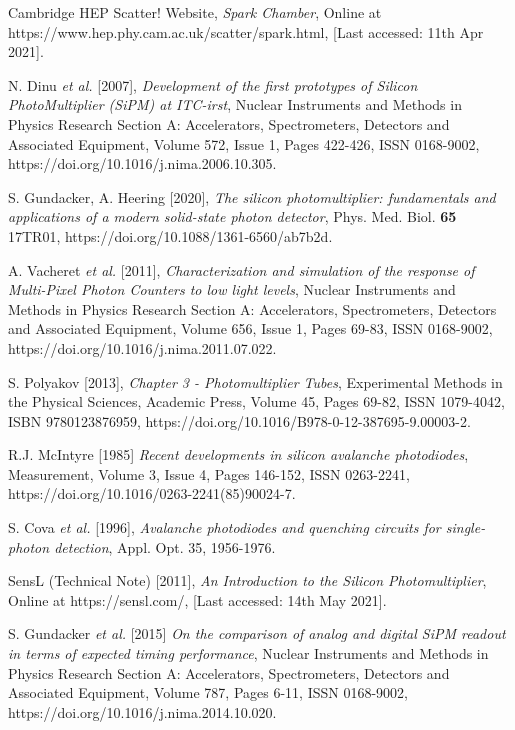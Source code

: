 \begin{thebibliography}{9}

Cambridge HEP Scatter! Website,
\textit{Spark Chamber},
Online at https://www.hep.phy.cam.ac.uk/scatter/spark.html,
[Last accessed: 11th Apr 2021].

N. Dinu \textit{et al.} [2007],
\textit{Development of the first prototypes of Silicon PhotoMultiplier (SiPM) at ITC-irst},
Nuclear Instruments and Methods in Physics Research Section A: Accelerators, Spectrometers, Detectors and Associated Equipment,
Volume 572, Issue 1, Pages 422-426, ISSN 0168-9002,
https://doi.org/10.1016/j.nima.2006.10.305.

S. Gundacker, A. Heering [2020],
\textit{The silicon photomultiplier: fundamentals and applications of a modern solid-state photon detector},
Phys. Med. Biol. \textbf{65} 17TR01,
https://doi.org/10.1088/1361-6560/ab7b2d.

A. Vacheret \textit{et al.} [2011],
\textit{Characterization and simulation of the response of Multi-Pixel Photon Counters to low light levels},
Nuclear Instruments and Methods in Physics Research Section A: Accelerators, Spectrometers, Detectors and Associated Equipment,
Volume 656, Issue 1, Pages 69-83, ISSN 0168-9002,
https://doi.org/10.1016/j.nima.2011.07.022.

S. Polyakov [2013],
\textit{Chapter 3 - Photomultiplier Tubes},
Experimental Methods in the Physical Sciences, Academic Press,
Volume 45, Pages 69-82, ISSN 1079-4042, ISBN 9780123876959,
https://doi.org/10.1016/B978-0-12-387695-9.00003-2.

R.J. McIntyre [1985]
\textit{Recent developments in silicon avalanche photodiodes},
Measurement, Volume 3, Issue 4, Pages 146-152, ISSN 0263-2241,
https://doi.org/10.1016/0263-2241(85)90024-7.

S. Cova \textit{et al.} [1996],
\textit{Avalanche photodiodes and quenching circuits for single-photon detection},
Appl. Opt. 35, 1956-1976.

SensL (Technical Note) [2011],
\textit{An Introduction to the Silicon Photomultiplier},
Online at https://sensl.com/,
[Last accessed: 14th May 2021].

S. Gundacker \textit{et al.} [2015]
\textit{On the comparison of analog and digital SiPM readout in terms of expected timing performance},
Nuclear Instruments and Methods in Physics Research Section A: Accelerators, Spectrometers, Detectors and Associated Equipment, Volume 787, Pages 6-11, ISSN 0168-9002,
https://doi.org/10.1016/j.nima.2014.10.020.


\end{thebibliography}
